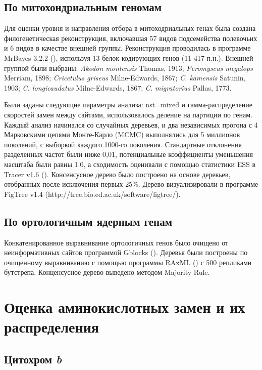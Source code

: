 \subsection{По митохондриальным геномам}
Для оценки уровня и направления отбора в митоходриальных генах была создана филогенетическая реконструкция, включавшая 57 видов подсемейства полевочьих и 6 видов в качестве внешней группы. Реконструкция проводилась в программе MrBayes 3.2.2 (\cite{Ronquist2012}), используя 13 белок-кодирующих генов (11 417 п.н.). Внешней группой были выбраны: \textit{Akodon montensis} Thomas, 1913; \textit{Peromyscus megalops} Merriam, 1898; \textit{Cricetulus griseus} Milne-Edwards, 1867; \textit{C. kamensis} Satunin, 1903; \textit{C. longicaudatus} Milne-Edwards, 1867; \textit{C. migratorius} Pallas, 1773.
 
Были заданы следующие параметры анализа: nst=mixed и гамма-распределение скоростей замен между сайтами, использовалось деление на партиции по генам. Каждый анализ начинался со случайных деревьев, и два независимых прогона с 4 Марковскими цепями Монте-Карло (MCMC) выполнялись для 5 миллионов поколений, с выборкой каждого 1000-го поколения. Стандартные отклонения разделенных частот были ниже 0,01, потенциальные коэффициенты уменьшения масштаба были равны 1.0, а сходимость оценивали с помощью статистики ESS в Tracer v1.6 (\cite{Rambaut2014}). Консенсусное дерево было построено на основе деревьев, отобранных после исключения первых 25\%. Дерево визуализировали в программе FigTree v1.4 (http://tree.bio.ed.ac.uk/software/figtree/).

\subsection{По ортологичным ядерным генам}

Конкатенированное выравнивание ортологичных генов было очищено от неинформативных сайтов программой Gblocks (\cite{Castresana2000}). Деревья были построены по очищенному выравниванию с помощью программы RAxML (\cite{Stamatakis2014}) с 500 репликами бутстрепа. Конценсусное дерево выведено методом Majority Rule.  

\section{Оценка аминокислотных замен и их распределения}

\subsection{Цитохром \textit{b}}

